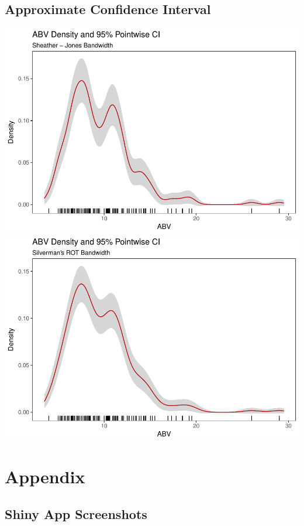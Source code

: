 \documentclass[]{article}
\begin{document}
\subsection{Approximate Confidence
Interval}\label{approximate-confidence-interval}

\includegraphics{FinalReport_files/figure-latex/unnamed-chunk-15-1.pdf}
\includegraphics{FinalReport_files/figure-latex/unnamed-chunk-15-2.pdf}

\section{Appendix}\label{appendix}

\subsection{Shiny App Screenshots}\label{shiny-app-screenshots}
\end{document}
